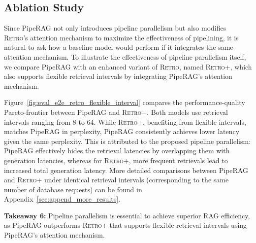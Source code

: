 \subsection{Ablation Study}

Since PipeRAG not only introduces pipeline parallelism but also modifies \textsc{Retro}'s attention mechanism to maximize the effectiveness of pipelining, it is natural to ask how a baseline model would perform if it integrates the same attention mechanism. To illustrate the effectiveness of pipeline parallelism itself, we compare PipeRAG with an enhanced variant of \textsc{Retro}, named \textsc{Retro+}, which also supports flexible retrieval intervals by integrating PipeRAG's attention mechanism.  

Figure~\ref{fig:eval_e2e_retro_flexible_interval} compares the performance-quality Pareto-frontier between PipeRAG and \textsc{Retro+}. 
Both models use retrieval intervals ranging from 8 to 64.
While \textsc{Retro+}, benefiting from flexible intervals, matches PipeRAG in perplexity, PipeRAG consistently achieves lower latency given the same perplexity. This is attributed to the proposed pipeline parallelism: PipeRAG effectively hides the retrieval latencies by overlapping them with generation latencies, whereas for \textsc{Retro+}, more frequent retrievals lead to increased total generation latency. More detailed comparisons between PipeRAG and \textsc{Retro+} under identical retrieval intervals (corresponding to the same number of database requests) can be found in Appendix~\ref{sec:append_more_results}.

\begin{tcolorbox}[
    enhanced,
    arc=2mm, %
    outer arc=2mm, %
    boxrule=0.8pt, %
    colframe=black, %
    colback=white, %
    boxsep=0pt, %
    drop shadow southeast, %
]

\textbf{Takeaway 6:} Pipeline parallelism is essential to achieve superior RAG efficiency, as PipeRAG outperforms \textsc{Retro+} that supports flexible retrieval intervals using PipeRAG's attention mechanism.
\end{tcolorbox}

